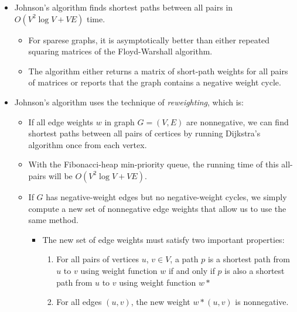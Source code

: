 \documentclass[a4paper,11pt]{article}
\begin{document}
\begin{itemize}
\itemsep1pt\parskip0pt
\item
  Johnson's algorithm finds shortest paths between all pairs in
  $O(V^2 \log V + VE)$ time.

  \begin{itemize}
  \itemsep1pt\parskip0pt
  \item
    For sparese graphs, it is asymptotically better than either repeated
    squaring matrices of the Floyd-Warshall algorithm.
  \item
    The algorithm either returns a matrix of short-path weights for all
    pairs of matrices or reports that the graph contains a negative
    weight cycle.
  \end{itemize}
\item
  Johnson's algorithm uses the technique of \emph{reweighting}, which
  is:

  \begin{itemize}
  \itemsep1pt\parskip0pt
  \item
    If all edge weights $w$ in graph $G = (V, E)$ are nonnegative, we
    can find shortest paths between all pairs of certices by running
    Dijkstra's algorithm once from each vertex.
  \item
    With the Fibonacci-heap min-priority queue, the running time of this
    all-pairs will be $O(V^2 \log V + VE)$.
  \item
    If $G$ has negative-weight edges but no negative-weight cycles, we
    simply compute a new set of nonnegative edge weights that allow us
    to use the same method.

    \begin{itemize}
    \itemsep1pt\parskip0pt
    \item
      The new set of edge weights must satisfy two important properties:

      \begin{enumerate}
      \def\labelenumi{\arabic{enumi}.}
      \itemsep1pt\parskip0pt
      \item
        For all pairs of vertices $u$, $v \in V$, a path $p$ is a
        shortest path from $u$ to $v$ using weight function $w$ if and
        only if $p$ is also a shortest path from $u$ to $v$ using weight
        function $w*$
      \item
        For all edges $(u, v)$, the new weight $w * (u, v)$ is
        nonnegative.
      \end{enumerate}
    \end{itemize}
  \end{itemize}
\end{itemize}
\end{document}
